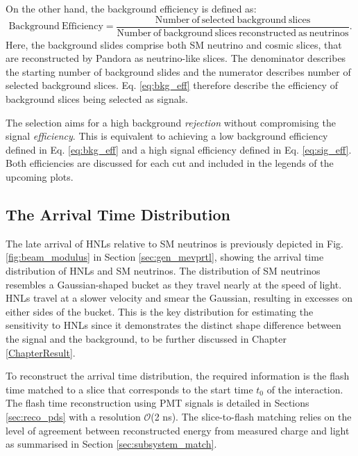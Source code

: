 On the other hand, the background efficiency is defined as:
\begin{equation}
	\label{eq:bkg_eff}
	\mathrm{Background\ Efficiency = \frac{Number\ of\ selected\ background\ slices}{Number\ of\ background\ slices\ reconstructed\ as\ neutrinos}}.
\end{equation}
Here, the background slides comprise both SM neutrino and cosmic slices, that are reconstructed by Pandora as neutrino-like slices.
The denominator describes the starting number of background slides and the numerator describes number of selected background slices. 
Eq. \ref{eq:bkg_eff} therefore describe the efficiency of background slices being selected as signals.

The selection aims for a high background \textit{rejection} without compromising the signal \textit{efficiency}.        
This is equivalent to achieving a low background efficiency defined in Eq. \ref{eq:bkg_eff} and a high signal efficiency defined in Eq. \ref{eq:sig_eff}.
Both efficiencies are discussed for each cut and included in the legends of the upcoming plots.                                                                                             

\subsection{The Arrival Time Distribution}
\label{sec:key_dist}


The late arrival of HNLs relative to SM neutrinos is previously depicted in Fig. \ref{fig:beam_modulus} in Section \ref{sec:gen_mevprtl}, showing the arrival time distribution of HNLs and SM neutrinos.
The distribution of SM neutrinos resembles a Gaussian-shaped bucket as they travel nearly at the speed of light.
HNLs travel at a slower velocity and smear the Gaussian, resulting in excesses on either sides of the bucket.
This is the key distribution for estimating the sensitivity to HNLs since it demonstrates the distinct shape difference between the signal and the background, to be further discussed in Chapter \ref{ChapterResult}.

To reconstruct the arrival time distribution, the required information is the flash time matched to a slice that corresponds to the start time $t_0$ of the interaction.
The flash time reconstruction using PMT signals is detailed in Sections \ref{sec:reco_pds} with a resolution $\mathcal{O}$(2 ns).
The slice-to-flash matching relies on the level of agreement between reconstructed energy from measured charge and light as summarised in Section \ref{sec:subsystem_match}.

